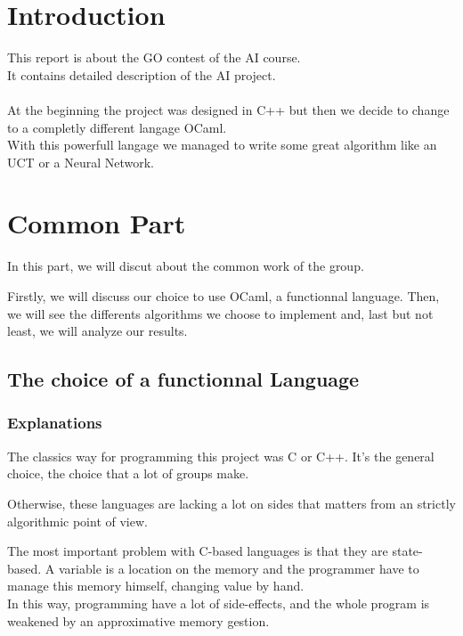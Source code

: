 

\tableofcontents

\chapter*{Introduction}

This report is about the GO contest of the AI course.\\
It contains detailed description of the AI project.\\
\\
At the beginning the project was designed in C++ but then we decide to change to
a completly different langage OCaml.\\
With this powerfull langage we managed to write some great algorithm like an UCT
or a Neural Network.\\


\chapter{Common Part}

In this part, we will discut about the common work of the group.

Firstly, we will discuss our choice to use OCaml, a functionnal language.
Then, we will see the differents algorithms we choose to implement and, last but not least, we will analyze our results.

\section{The choice of a functionnal Language}

\subsection{Explanations}

The classics way for programming this project was C or C++. It's the general choice, the choice that a lot of groups make.

Otherwise, these languages are lacking a lot on sides that matters from an strictly algorithmic point of view.

The most important problem with C-based languages is that they are state-based. A variable is a location on the memory and the programmer have to manage this memory himself, changing value by hand.\\

In this way, programming have a lot of side-effects, and the whole program is weakened by  an approximative memory gestion.

